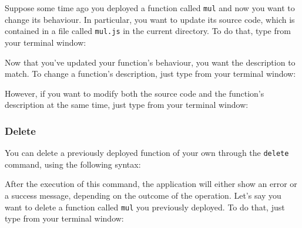 Suppose some time ago you deployed a function called \texttt{mul} and now you want to change its behaviour. In particular, you want to update its source code, which is contained in a file called \texttt{mul.js} in the current directory. To do that, type from your terminal window:
\begin{center}
\end{center}
Now that you've updated your function's behaviour, you want the description to match. To change a function's description, just type from your terminal window:
\begin{center}
\end{center}
However, if you want to modify both the source code and the function's description at the same time, just type from your terminal window:
\begin{center}
\end{center}

\subsubsection{Delete}
You can delete a previously deployed function of your own through the \texttt{delete} command, using the following syntax:
\begin{center}
\end{center}
After the execution of this command, the application will either show an error or a success message, depending on the outcome of the operation.
Let's say you want to delete a function called \texttt{mul} you previously deployed. To do that, just type from your terminal window:
\begin{center}
\end{center}